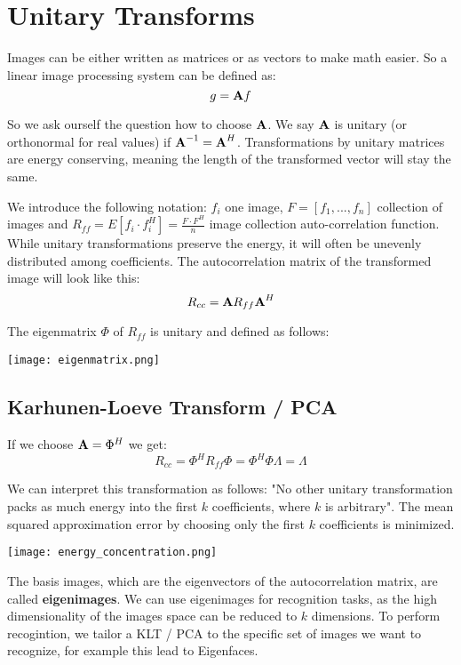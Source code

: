 \section{Unitary Transforms}

Images can be either written as matrices or as vectors to make math easier. So a linear image processing system can be defined as:
$$g = \textbf A f$$

So we ask ourself the question how to choose $\textbf A$. We say $\textbf A$ is unitary (or orthonormal for real values) if $\textbf A^{-1} = \textbf A^H$. Transformations by unitary matrices are energy conserving, meaning the length of the transformed vector will stay the same.

We introduce the following notation: $f_i$ one image, $F = [f_1, ..., f_n]$ collection of images and $R_{ff} = E[f_i \cdot f_i^H] = \frac{F \cdot F^H}{n}$ image collection auto-correlation function. While unitary transformations preserve the energy, it will often be unevenly distributed among coefficients. The autocorrelation matrix of the transformed image will look like this: 
$$R_{cc} = \textbf A R_{ff} \textbf A^H$$

The eigenmatrix $\Phi$ of $R_{ff}$ is unitary and defined as follows:
\begin{center}
	\texttt{[image: eigenmatrix.png]}
\end{center}

\subsection{Karhunen-Loeve Transform / PCA}

If we choose $\textbf A = \Phi^H$ we get:
$$R_{cc} = \Phi^H R_{ff} \Phi = \Phi^H \Phi \Lambda = \Lambda$$

We can interpret this transformation as follows: "No other unitary transformation packs as much energy into the first $k$ coefficients, where $k$ is arbitrary". The mean squared approximation error by choosing only the first $k$ coefficients is minimized. 
\begin{center}
	\texttt{[image: energy\_concentration.png]}
\end{center}

The basis images, which are the eigenvectors of the autocorrelation matrix, are called \textbf{eigenimages}. We can use eigenimages for recognition tasks, as the high dimensionality of the images space can be reduced to $k$ dimensions. To perform recogintion, we tailor a KLT / PCA to the specific set of images we want to recognize, for example this lead to Eigenfaces. \medskip

